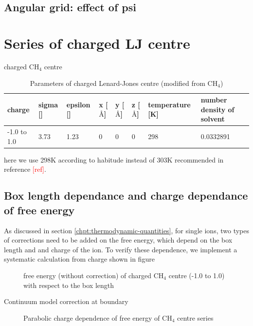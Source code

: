 \subsection{Angular grid: effect of psi}


\section{Series of charged LJ centre}

charged $\mathrm{C}\mathrm{H}_{4}$ centre

\begin{table}
\begin{centering}
\begin{tabular*}{1\linewidth}{@{\extracolsep{\fill}}llllllll}
\toprule 
charge  & sigma {[}{]} & epsilon {[}{]} & x {[}$\textrm{\AA}${]} & y {[}$\textrm{\AA}${]} & z {[}$\textrm{\AA}${]} & temperature {[}K{]} & number density of solvent\tabularnewline
\midrule
-1.0 to 1.0 & 3.73  & 1.23  & 0 & 0 & 0 & 298 & 0.0332891\tabularnewline
\bottomrule
\end{tabular*}
\par\end{centering}

\caption{Parameters of charged Lenard-Jones centre (modified from $\mathrm{C}\mathrm{H}_{4}$) }
\end{table}


here we use 298K according to habitude instead of 303K recommended
in reference \textcolor{red}{{[}ref{]}}.


\subsection{Box length dependance and charge dependance of free energy}

As discussed in section \ref{chpt:thermodynamic-quantities}, for
single ions, two types of corrections need to be added on the free
energy, which depend on the box length and and charge of the ion.
To verify these dependence, we implement a systematic calculation
from charge shown in figure

\begin{figure}
\caption{free energy (without correction) of charged $\mathrm{C}\mathrm{H}_{4}$
centre (-1.0 to 1.0) with respect to the box length}
\end{figure}


Continuum model correction at boundary

\begin{figure}
\caption{Parabolic charge dependence of free energy of $\mathrm{C}\mathrm{H}_{4}$
centre series}
\end{figure}


